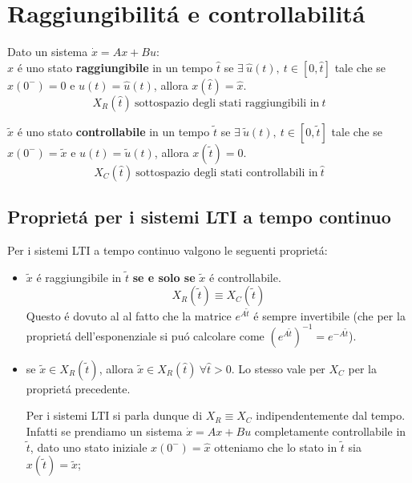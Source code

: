 \documentclass[../main.tex]{subfiles}
\begin{document}
	\makeatletter
	\newcommand{\setword}[2]{%
		\phantomsection
		#1\def\@currentlabel{\unexpanded{#1}}\label{#2}%
	}
	\makeatother
	
	\section{Raggiungibilit\'a e controllabilit\'a}
		Dato un sistema $ \dot x = A x + B u $:\\
		
		$ \hat x $ \'e uno stato \textbf{raggiungibile} in un tempo $ \hat t $ se $ \exists\ \hat u(t),\ t \in [0, \hat t] $ tale che se $ x(0^-) = 0 $ e $ u(t) = \hat u(t) $, allora $ x(\hat t) = \hat x $.
		\[
			X_R(\hat t)\ \text{sottospazio degli stati raggiungibili in}\ \hat t
		\]
		
		$ \tilde x $ \'e uno stato \textbf{controllabile} in un tempo $ \tilde t $ se $ \exists\ \tilde u(t),\ t \in [0, \tilde t] $ tale che se $ x(0^-) = \tilde x $ e $ u(t) = \tilde u(t) $, allora $ x(\tilde t) = 0 $.
		\[ X_C(\hat t)\ \text{sottospazio degli stati controllabili in}\ \hat t \]
		
	\subsection{Propriet\'a per i sistemi LTI a tempo continuo}
		Per i sistemi LTI a tempo continuo valgono le seguenti propriet\'a:
		\begin{itemize}
			\item
				$ \tilde x $ \'e raggiungibile in $ \tilde t $ \textbf{se e solo se} $ \tilde x $ \'e controllabile.
				\[
					X_R(\tilde t) \equiv X_C(\tilde t)
				\]
				Questo \'e dovuto al al fatto che la matrice $ e^{A \tilde t} $ \'e sempre invertibile (che per la propriet\'a dell'esponenziale si pu\'o calcolare come $ \left( e^{A \tilde t} \right)^{-1} = e^{-A \tilde t} $).
				
			\item
				se $ \tilde x \in X_R(\tilde t) $, allora $ \tilde x \in X_R(\hat t)\ \forall \hat t > 0 $.
				Lo stesso vale per $ X_C $ per la propriet\'a precedente.
				
				Per i sistemi LTI si parla dunque di $ X_R \equiv X_C $ indipendentemente dal tempo.\\
				Infatti se prendiamo un sistema 	$ \dot x = A x + B u $ completamente controllabile in $ \tilde t $, dato uno stato iniziale $ x(0^-) = \hat x $ otteniamo che lo stato in $ \tilde t $ sia $ x(\tilde t) = \tilde x $;
			\end{itemize}
\end{document}
